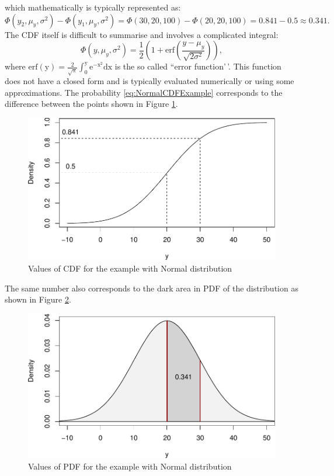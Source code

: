 \documentclass[
]{book}
\theoremstyle{definition}
\theoremstyle{definition}
\theoremstyle{definition}
\theoremstyle{definition}
\theoremstyle{remark}
\begin{document}
which mathematically is typically represented as:
\begin{equation}
    \Phi(y_2, \mu_y, \sigma^2) - \Phi(y_1, \mu_y, \sigma^2) = \Phi(30, 20, 100) - \Phi(20, 20, 100) = 0.841 - 0.5 \approx 0.341.
    \label{eq:NormalCDFExample}
\end{equation}
The CDF itself is difficult to summarise and involves a complicated integral:
\begin{equation}
    \Phi(y, \mu_y, \sigma^2) = \frac{1}{2} \left(1 + \mathrm{erf}\left(\frac{y-\mu_y}{\sqrt{2\sigma^2}} \right) \right),
    \label{eq:NormalCDFE}
\end{equation}
where \(\mathrm{erf(y)= \frac{2}{\sqrt{\pi}} \int_{0}^{y} e^{-x^2} dx}\) is the so called ``error function'\,'. This function does not have a closed form and is typically evaluated numerically or using some approximations. The probability \eqref{eq:NormalCDFExample} corresponds to the difference between the points shown in Figure \ref{fig:pnormExample}.

\begin{figure}
\centering
\includegraphics{Svetunkov---Statistics-for-Business-Analytics_files/figure-latex/pnormExample-1.pdf}
\caption{\label{fig:pnormExample}Values of CDF for the example with Normal distribution}
\end{figure}

The same number also corresponds to the dark area in PDF of the distribution as shown in Figure \ref{fig:dnormExample}.

\begin{figure}
\centering
\includegraphics{Svetunkov---Statistics-for-Business-Analytics_files/figure-latex/dnormExample-1.pdf}
\caption{\label{fig:dnormExample}Values of PDF for the example with Normal distribution}
\end{figure}
\end{document}
